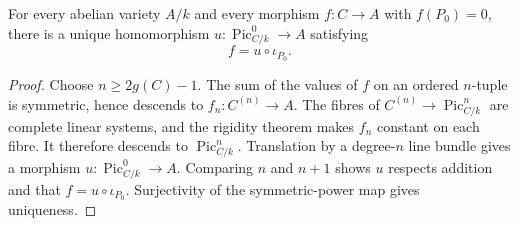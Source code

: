 \begin{theorem}
  \label{pa-thm-albanese}
  \cite{milne-av}
  For every abelian variety \(A/k\) and every morphism
  \(f:C\to A\) with \(f(P_0)=0\), there is a unique homomorphism
  \(u:\operatorname{Pic}^0_{C/k}\to A\) satisfying
  \[
    f=u\circ\iota_{P_0}.
  \]
\end{theorem}

\begin{proof}
  Choose \(n\ge 2g(C)-1\).  The sum of the values of \(f\) on an ordered
  \(n\)-tuple is symmetric, hence descends to \(f_n:C^{(n)}\to A\).  The
  fibres of \(C^{(n)}\to\operatorname{Pic}^n_{C/k}\) are complete linear
  systems, and the rigidity theorem makes \(f_n\) constant on each fibre.
  It therefore descends to \(\operatorname{Pic}^n_{C/k}\).  Translation by a
  degree-\(n\) line bundle gives a morphism
  \(u:\operatorname{Pic}^0_{C/k}\to A\).  Comparing \(n\) and \(n+1\) shows
  \(u\) respects addition and that \(f=u\circ\iota_{P_0}\).  Surjectivity of
  the symmetric-power map gives uniqueness.
\end{proof}

